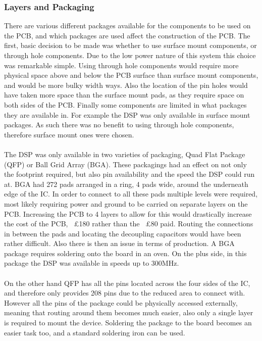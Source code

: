 \subsubsection{Layers and Packaging}
There are various different packages available for the components to be used on the PCB, and which packages are used affect the construction of the PCB.
The first, basic decision to be made was whether to use surface mount components, or through hole components.
Due to the low power nature of this system this choice was remarkable simple.
Using through hole components would require more physical space above and below the PCB surface than surface mount components, and would be more bulky width ways.
Also the location of the pin holes would have taken more space than the surface mount pads, as they require space on both sides of the PCB.
Finally some components are limited in what packages they are available in.
For example the DSP was only available in surface mount packages.
As such there was no benefit to using through hole components, therefore surface mount ones were chosen.
\\
\\
The DSP was only available in two varieties of packaging, Quad Flat Package (QFP) or Ball Grid Array (BGA).
These packagings had an effect on not only the footprint required, but also pin availability and the speed the DSP could run at.
BGA had 272 pads arranged in a ring, 4 pads wide, around the underneath edge of the IC.
In order to connect to all these pads multiple levels were required, most likely requiring power and ground to be carried on separate layers on the PCB.
Increasing the PCB to 4 layers to allow for this would drastically increase the cost of the PCB, ~\pounds180 rather than the ~\pounds80 paid.
Routing the connections in between the pads and locating the decoupling capacitors would have been rather difficult.
Also there is then an issue in terms of production.
A BGA package requires soldering onto the board in an oven.
On the plus side, in this package the DSP was available in speeds up to 300MHz.
\\
\\
On the other hand QFP has all the pins located across the four sides of the IC, and therefore only provides 208 pins due to the reduced area to connect with.
However all the pins of the package could be physically accessed externally, meaning that routing around them becomes much easier, also only a single layer is required to mount the device.
Soldering the package to the board becomes an easier task too, and a standard soldering iron can be used.
